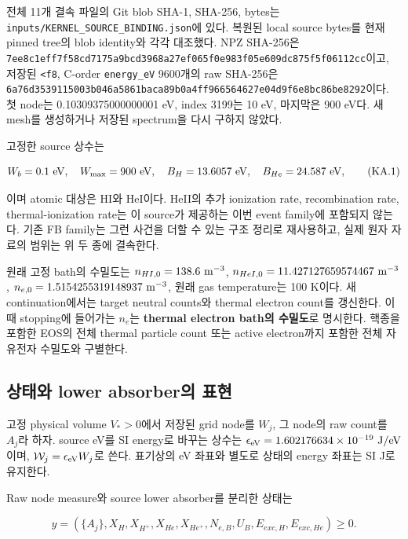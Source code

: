 전체 11개 결속 파일의 Git blob SHA-1, SHA-256, bytes는 \nolinkurl{inputs/KERNEL_SOURCE_BINDING.json}에 있다. 복원된 local source bytes를 현재 pinned tree의 blob identity와 각각 대조했다. NPZ SHA-256은 \nolinkurl{7ee8c1eff7f58cd7175a9bcd3968a27ef065f0e983f05e609dc875f5f06112cc}이고, 저장된 \texttt{\textless{}f8}, C-order \texttt{energy\_eV} 9600개의 raw SHA-256은 \nolinkurl{6a76d3539115003b046a5861baca89b0a4ff966564627e04d9f6e8bc86be8292}이다. 첫 node는 0.10309375000000001 eV, index 3199는 10 eV, 마지막은 900 eV다. 새 mesh를 생성하거나 저장된 spectrum을 다시 구하지 않았다.

고정한 source 상수는

\[
 W_b=0.1\ {\rm eV},\quad W_{\max}=900\ {\rm eV},\quad
 B_H=13.6057\ {\rm eV},\quad B_{He}=24.587\ {\rm eV},
 \tag{KA.1}
\]

이며 atomic 대상은 HI와 HeI이다. HeII의 추가 ionization rate, recombination rate, thermal-ionization rate는 이 source가 제공하는 이번 event family에 포함되지 않는다. 기존 FB family는 그런 사건을 더할 수 있는 구조 정리로 재사용하고, 실제 원자 자료의 범위는 위 두 종에 결속한다.

원래 고정 bath의 수밀도는 \(n_{HI,0}=138.6\ {\rm m}^{-3}\), \(n_{HeI,0}=11.427127659574467\ {\rm m}^{-3}\), \(n_{e,0}=1.5154255319148937\ {\rm m}^{-3}\), 원래 gas temperature는 100 K이다. 새 continuation에서는 target neutral counts와 thermal electron count를 갱신한다. 이때 stopping에 들어가는 \(n_e\)는 \textbf{thermal electron bath의 수밀도}로 명시한다. 핵종을 포함한 EOS의 전체 thermal particle count 또는 active electron까지 포함한 전체 자유전자 수밀도와 구별한다.

\hypertarget{uxc0c1uxd0dcuxc640-lower-absorberuxc758-uxd45cuxd604}{%
\subsection{상태와 lower absorber의 표현}\label{uxc0c1uxd0dcuxc640-lower-absorberuxc758-uxd45cuxd604}}

고정 physical volume \(V_*>0\)에서 저장된 grid node를 \(W_j\), 그 node의 raw count를 \(A_j\)라 하자. source eV를 SI energy로 바꾸는 상수는 \(\epsilon_{\rm eV}=1.602176634\times10^{-19}\ {\rm J/eV}\)이며, \(\mathcal W_j=\epsilon_{\rm eV}W_j\)로 쓴다. 표기상의 eV 좌표와 별도로 상태의 energy 좌표는 SI J로 유지한다.

Raw node measure와 source lower absorber를 분리한 상태는

\[
 y=(\{A_j\},X_H,X_{H^+},X_{He},X_{He^+},N_{e,B},U_B,
                   E_{exc,H},E_{exc,He})\ge0.
 \tag{KA.2}
\]

